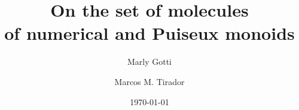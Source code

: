 \documentclass[12pt]{amsart}
\theoremstyle{definition}
\numberwithin{equation}{section}
\newcommand\nn{\mathbb{N}}
\newcommand\qq{\mathbb{Q}}
\begin{document}
\mbox{}
\title{On the set of molecules \\ of numerical and Puiseux monoids}

\author{Marly Gotti}
\address{Department of Research and Development \\ Biogen \\ Cambridge \\ MA 02142 \\ USA}

\author{Marcos M. Tirador}
\address{Facultad de Matem\'atica y Computaci\'on \\ Universidad de La Habana \\ San L\'azaro y~L, Vedado \\ Habana 4 \\ CP-10400 \\ Cuba}

\date{\today}

\medskip

\maketitle

\medskip

\end{document}
